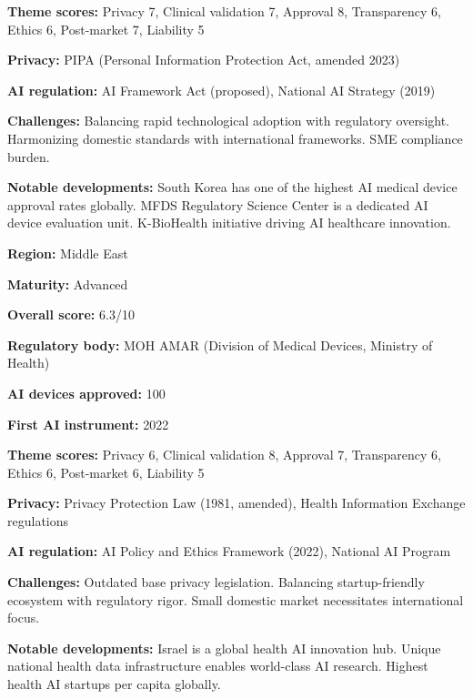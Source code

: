 \noindent\textbf{Theme scores:} Privacy 7, Clinical validation 7, Approval 8, Transparency 6, Ethics 6, Post-market 7, Liability 5\par
\noindent\textbf{Privacy:} PIPA (Personal Information Protection Act, amended 2023)\par
\noindent\textbf{AI regulation:} AI Framework Act (proposed), National AI Strategy (2019)\par
\noindent\textbf{Challenges:} Balancing rapid technological adoption with regulatory oversight. Harmonizing domestic standards with international frameworks. SME compliance burden.\par
\noindent\textbf{Notable developments:} South Korea has one of the highest AI medical device approval rates globally. MFDS Regulatory Science Center is a dedicated AI device evaluation unit. K-BioHealth initiative driving AI healthcare innovation.\par
\vspace{0.55em}
\par
\vspace{0.15em}
\noindent\textbf{Region:} Middle East\par
\noindent\textbf{Maturity:} Advanced\par
\noindent\textbf{Overall score:} 6.3/10\par
\noindent\textbf{Regulatory body:} MOH AMAR (Division of Medical Devices, Ministry of Health)\par
\noindent\textbf{AI devices approved:} 100\par
\noindent\textbf{First AI instrument:} 2022\par
\noindent\textbf{Theme scores:} Privacy 6, Clinical validation 8, Approval 7, Transparency 6, Ethics 6, Post-market 6, Liability 5\par
\noindent\textbf{Privacy:} Privacy Protection Law (1981, amended), Health Information Exchange regulations\par
\noindent\textbf{AI regulation:} AI Policy and Ethics Framework (2022), National AI Program\par
\noindent\textbf{Challenges:} Outdated base privacy legislation. Balancing startup-friendly ecosystem with regulatory rigor. Small domestic market necessitates international focus.\par
\noindent\textbf{Notable developments:} Israel is a global health AI innovation hub. Unique national health data infrastructure enables world-class AI research. Highest health AI startups per capita globally.\par

